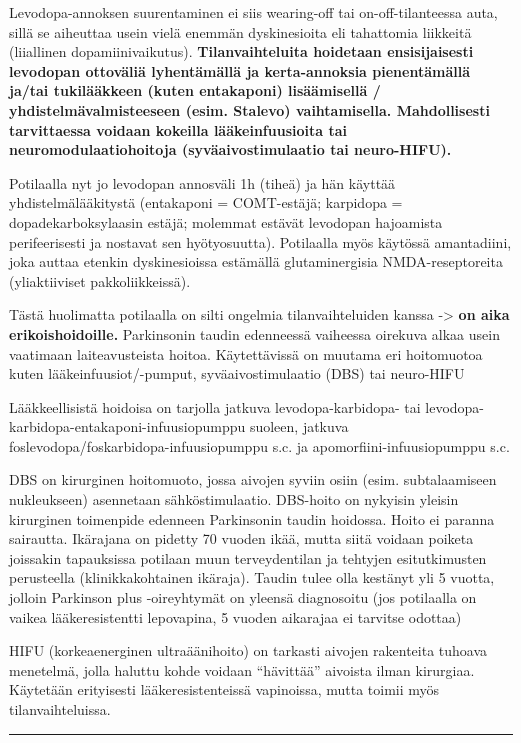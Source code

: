 \documentclass[
]{book}
\begin{document}
Levodopa-annoksen suurentaminen ei siis wearing-off tai on-off-tilanteessa auta, sillä se aiheuttaa usein vielä enemmän dyskinesioita eli tahattomia liikkeitä (liiallinen dopamiinivaikutus). \textbf{Tilanvaihteluita hoidetaan ensisijaisesti levodopan ottoväliä lyhentämällä ja kerta-annoksia pienentämällä ja/tai tukilääkkeen (kuten entakaponi) lisäämisellä / yhdistelmävalmisteeseen (esim. Stalevo) vaihtamisella. Mahdollisesti tarvittaessa voidaan kokeilla lääkeinfuusioita tai neuromodulaatiohoitoja (syväaivostimulaatio tai neuro-HIFU).}

Potilaalla nyt jo levodopan annosväli 1h (tiheä) ja hän käyttää yhdistelmälääkitystä (entakaponi = COMT-estäjä; karpidopa = dopadekarboksylaasin estäjä; molemmat estävät levodopan hajoamista perifeerisesti ja nostavat sen hyötyosuutta). Potilaalla myös käytössä amantadiini, joka auttaa etenkin dyskinesioissa estämällä glutaminergisia NMDA-reseptoreita (yliaktiiviset pakkoliikkeissä).

Tästä huolimatta potilaalla on silti ongelmia tilanvaihteluiden kanssa -\textgreater{} \textbf{on aika erikoishoidoille.} Parkinsonin taudin edenneessä vaiheessa oirekuva alkaa usein vaatimaan laiteavusteista hoitoa. Käytettävissä on muutama eri hoitomuotoa kuten lääkeinfuusiot/-pumput, syväaivostimulaatio (DBS) tai neuro-HIFU

Lääkkeellisistä hoidoisa on tarjolla jatkuva levodopa-karbidopa- tai levodopa-karbidopa-entakaponi-infuusiopumppu suoleen, jatkuva foslevodopa/foskarbidopa-infuusiopumppu s.c. ja apomorfiini-infuusiopumppu s.c.

DBS on kirurginen hoitomuoto, jossa aivojen syviin osiin (esim. subtalaamiseen nukleukseen) asennetaan sähköstimulaatio. DBS-hoito on nykyisin yleisin kirurginen toimenpide edenneen Parkinsonin taudin hoidossa. Hoito ei paranna sairautta. Ikärajana on pidetty 70 vuoden ikää, mutta siitä voidaan poiketa joissakin tapauksissa potilaan muun terveydentilan ja tehtyjen esitutkimusten perusteella (klinikkakohtainen ikäraja). Taudin tulee olla kestänyt yli 5 vuotta, jolloin Parkinson plus -oireyhtymät on yleensä diagnosoitu (jos potilaalla on vaikea lääkeresistentti lepovapina, 5 vuoden aikarajaa ei tarvitse odottaa)

HIFU (korkeaenerginen ultraäänihoito) on tarkasti aivojen rakenteita tuhoava menetelmä, jolla haluttu kohde voidaan ``hävittää'' aivoista ilman kirurgiaa. Käytetään erityisesti lääkeresistenteissä vapinoissa, mutta toimii myös tilanvaihteluissa.

\begin{center}\rule{0.5\linewidth}{0.5pt}\end{center}
\end{document}
